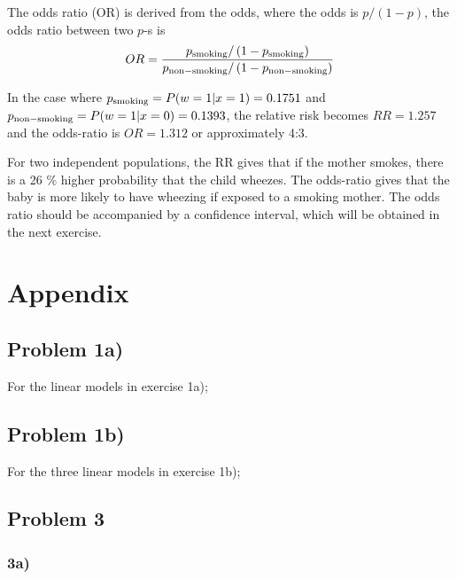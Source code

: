 \documentclass[a4paper,11pt]{article}
\begin{document}
\begin{enumerate}[label=\alph*)]
        The odds ratio (OR) is derived from the odds, where the odds is $p/(1-p)$, the odds ratio between two $p$-s is
        \begin{equation}
            OR = \frac{p_{\rm smoking} / \left( 1-p_{\rm smoking} \right)}{p_{\rm non-smoking} / \left( 1-p_{\rm non-smoking} \right)}
            \label{eq:OR}
        \end{equation}

        In the case where $p_{\rm smoking} = P(w=1 | x=1 ) = 0.1751$ and $p_{\rm non-smoking} = P(w=1 | x=0) = 0.1393$, the relative risk becomes $RR = 1.257$ and the odds-ratio is $OR = 1.312$ or approximately 4:3. 

        For two independent populations, the RR gives that if the mother smokes, there is a 26 \% higher probability that the child wheezes. The odds-ratio gives that the baby is more likely to have wheezing if exposed to a smoking mother. The odds ratio should be accompanied by a confidence interval, which will be obtained in the next exercise. 


\end{enumerate}



%
%

\clearpage
\appendix
\section{Appendix}
\label{sec:appendix}

\subsection{Problem 1a)}
\label{app:b}

For the linear models in exercise 1a);
{\footnotesize
    
}

\subsection{Problem 1b)}
\label{app:b}

For the three linear models in exercise 1b);
{\footnotesize
    
}

\subsection{Problem 3}
\subsubsection{3a)}
{\footnotesize
    
}



%
\end{document}
